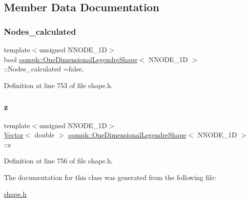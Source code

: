 \subsection{Member Data Documentation}
\mbox{\label{classoomph_1_1OneDimensionalLegendreShape_ac10397bf5b832aa567e4114d8e9a5795}} 
\subsubsection{\texorpdfstring{Nodes\+\_\+calculated}{Nodes\_calculated}}
{\footnotesize\ttfamily template$<$unsigned N\+N\+O\+D\+E\+\_\+1D$>$ \\
bool \hyperlink{classoomph_1_1OneDimensionalLegendreShape}{oomph\+::\+One\+Dimensional\+Legendre\+Shape}$<$ N\+N\+O\+D\+E\+\_\+1D $>$\+::Nodes\+\_\+calculated =false\hspace{0.3cm}{\ttfamily [static]}, {\ttfamily [private]}}



Definition at line 753 of file shape.\+h.

\mbox{\label{classoomph_1_1OneDimensionalLegendreShape_ab2d2b8418ac85a8ebf643d365fd52678}} 
\subsubsection{\texorpdfstring{z}{z}}
{\footnotesize\ttfamily template$<$unsigned N\+N\+O\+D\+E\+\_\+1D$>$ \\
\hyperlink{classoomph_1_1Vector}{Vector}$<$ double $>$ \hyperlink{classoomph_1_1OneDimensionalLegendreShape}{oomph\+::\+One\+Dimensional\+Legendre\+Shape}$<$ N\+N\+O\+D\+E\+\_\+1D $>$\+::z\hspace{0.3cm}{\ttfamily [static]}}



Definition at line 756 of file shape.\+h.



The documentation for this class was generated from the following file\+:\begin{DoxyCompactItemize}
\item 
\hyperlink{shape_8h}{shape.\+h}\end{DoxyCompactItemize}
